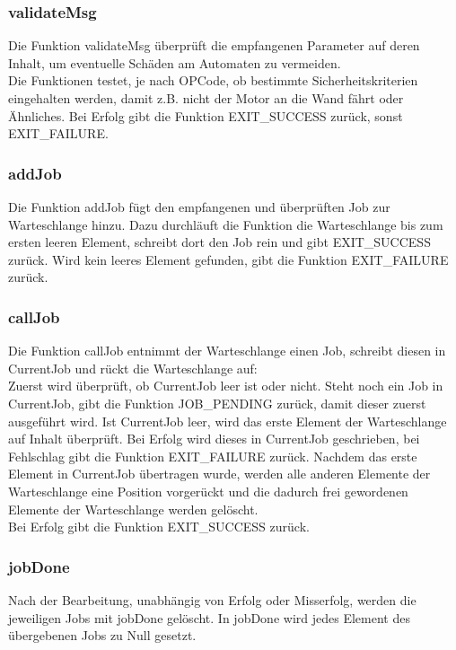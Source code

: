 \documentclass{scrartcl}
\begin{document}
\subsubsection{validateMsg}
Die Funktion validateMsg überprüft die empfangenen Parameter auf deren Inhalt, um eventuelle Schäden am Automaten zu vermeiden. \\
Die Funktionen testet, je nach OPCode, ob bestimmte Sicherheitskriterien eingehalten werden, damit z.B. nicht der Motor an die Wand fährt oder Ähnliches. Bei Erfolg gibt die Funktion EXIT\_SUCCESS zurück, sonst EXIT\_FAILURE.


\subsubsection{addJob}
Die Funktion addJob fügt den empfangenen und überprüften Job zur Warteschlange hinzu. Dazu durchläuft die Funktion die Warteschlange bis zum ersten leeren Element, schreibt dort den Job rein und gibt EXIT\_SUCCESS zurück. Wird kein leeres Element gefunden, gibt die Funktion EXIT\_FAILURE zurück.

\subsubsection{callJob}
Die Funktion callJob entnimmt der Warteschlange einen Job, schreibt diesen in CurrentJob und rückt die Warteschlange auf:\\
Zuerst wird überprüft, ob CurrentJob leer ist oder nicht. Steht noch ein Job in CurrentJob, gibt die Funktion JOB\_PENDING zurück, damit dieser zuerst ausgeführt wird. Ist CurrentJob leer, wird das erste Element der Warteschlange auf Inhalt überprüft. Bei Erfolg wird dieses in CurrentJob geschrieben, bei Fehlschlag gibt die Funktion EXIT\_FAILURE zurück. Nachdem das erste Element in CurrentJob übertragen wurde, werden alle anderen Elemente der Warteschlange eine Position vorgerückt und die dadurch frei gewordenen Elemente der Warteschlange werden gelöscht.\\
Bei Erfolg gibt die Funktion EXIT\_SUCCESS zurück.

\subsubsection{jobDone}
Nach der Bearbeitung, unabhängig von Erfolg oder Misserfolg, werden die jeweiligen Jobs mit jobDone gelöscht. In jobDone wird jedes Element des übergebenen Jobs zu Null gesetzt.
\end{document}
